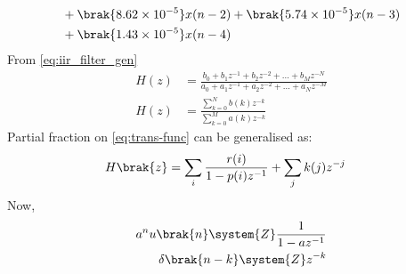 \documentclass[journal,12pt,twocolumn]{IEEEtran}
\theoremstyle{remark}
\begin{document}
\begin{enumerate}[label=\thesection.\arabic*]
\begin{align}
																																																																																								&+ \brak{8.62 \times 10^{-5}}x(n - 2) + \brak{5.74 \times 10^{-5}}x(n - 3) \nonumber \\
																																																																																									&+ \brak{1.43 \times 10^{-5}}x(n - 4)
																																																																																									\end{align}
																																																																																									From \eqref{eq:iir_filter_gen} 
																																																																																									\begin{align}
																																																																																									    H(z) &= \frac{b_0 + b_1 z^{-1} + b_2 z^{-2} + \ldots + b_M z^{-N}}{a_0 + a_1 z^{-1} + a_2 z^{-2} + \ldots + a_N z^{-M}}\\
																																																																																									        H(z) &= \frac{\sum_{k = 0}^{N}b(k)z^{-k}}{\sum_{k = 0}^{M}a(k)z^{-k}} \label{eq:trans-func}
																																																																																										\end{align}
																																																																																										Partial fraction on \eqref{eq:trans-func} can be generalised as:
																																																																																										\begin{align}
																																																																																										    H\brak{z}&= \sum_{i}\frac{r(i)}{1 - p(i)z^{-1}} + \sum_{j}k(j)z^{-j}
																																																																																										    	\label{eq:trans-func-pfe}
																																																																																											\end{align}
																																																																																											Now,
																																																																																											\begin{align}
																																																																																											    a^{n}u\brak{n} \system{Z} \frac{1}{1-az^{-1}} \label{eq:res-1}\\
																																																																																											        \delta\brak{n-k} \system{Z} z^{-k}\label{eq:res-2}

\end{align}
\end{enumerate}
\end{document}
